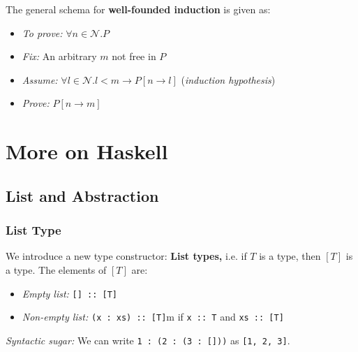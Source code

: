 \documentclass[a4paper]{extarticle}
\begin{document}
The general schema for \textbf{well-founded induction} is given as:

\begin{itemize}
    \item \textit{To prove:} \(\forall n \in \mathcal{N}.P\)
    \item \textit{Fix:} An arbitrary \(m\) not free in \(P\)
    \item \textit{Assume:} \(\forall l \in \mathcal{N} . l < m \to P[n \to l]\) (\textit{induction hypothesis})
    \item \textit{Prove:} \(P[n \to m]\)
\end{itemize}

\section{More on Haskell}

\subsection{List and Abstraction}

\subsubsection{List Type}

We introduce a new type constructor: \textbf{List types,} i.e. if \(T\) is a type, then \([T]\) is a type. The elements of \([T]\) are:

\begin{itemize}
    \item \textit{Empty list:} \verb|[] :: [T]|
    \item \textit{Non-empty list:} \verb|(x : xs) :: [T]|m if \verb|x :: T| and \verb|xs :: [T]|
\end{itemize}

\textit{Syntactic sugar:} We can write \verb|1 : (2 : (3 : []))| as \verb|[1, 2, 3]|.
\end{document}
